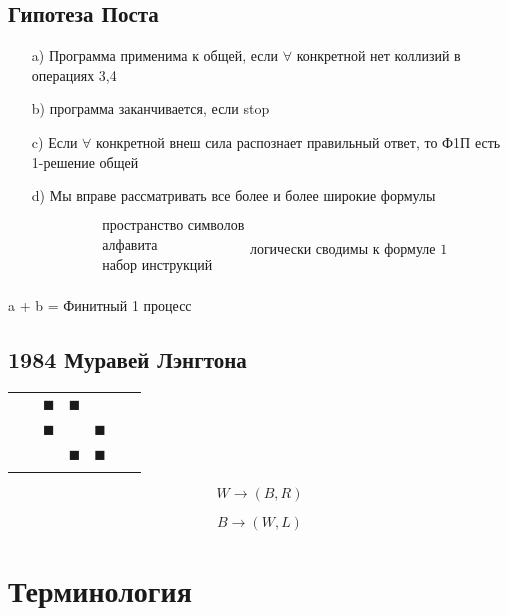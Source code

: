 \documentclass[a4paper, 14pt]{report}
\begin{document}
\section{Гипотеза Поста}

\begin{enumerate}
    \item[a)] Программа применима к общей, если $\forall$ конкретной нет коллизий в операциях 3,4
    \item[b)] программа заканчивается, если stop
    \item[c)] Если $\forall$ конкретной внеш сила распознает правильный ответ, то Ф1П есть 1-решение общей
    \item[d)] Мы вправе рассматривать все более и более широкие формулы

        $$
            \begin{array}{l}
            \text{пространство символов} \\
            \text{алфавита} \\
            \text{набор инструкций} \\
            \end{array}
        \text{логически сводимы к формуле 1}
        $$
\end{enumerate}

a + b = Финитный 1 процесс

\section{1984 Муравей Лэнгтона}
\begin{tabular}{c|c|c|c|c|c|c}
    & & & & & & \\
    \hline
    & & $\blacksquare$ & $\blacksquare$ & & & \\
    \hline
    & & $\blacksquare$ & & $\blacksquare$ & & \\
    \hline
    & & & $\blacksquare$ & $\blacksquare$ & & \\
    \hline
    & & & & & & \\
\end{tabular}

$$
W \to (B,R)
$$

$$
B \to (W,L)
$$

%
%
%
%
%
%
%
%
%
%
%
%
%

\chapter{Терминология}
\end{document}
